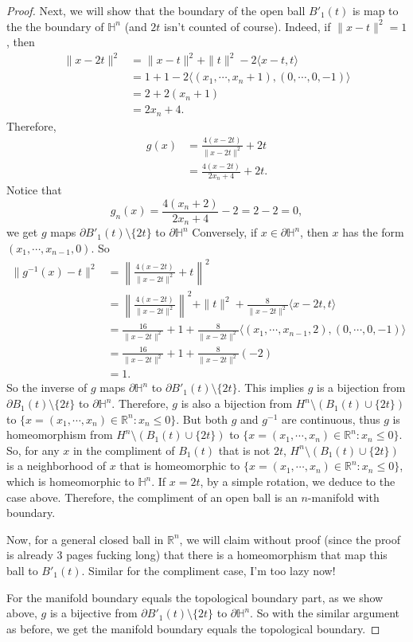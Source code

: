 \documentclass[12pt, a4paper]{article}
\theoremstyle{plain}
\newcommand{\Hs}{\mathbb{H}}
\newcommand{\R}{\mathbb{R}}
\begin{document}
\begin{proof}
	Next, we will show that the boundary of the open ball $B'_1(t)$ is map to the the boundary of $\Hs^n$ (and $2t$ isn't counted of course). Indeed, if $\|x-t\|^2=1$, then 
	\begin{align*}
	\|x-2t\|^2&=\|x-t\|^2+\|t\|^2-2\langle{x-t,t}\rangle\\
	&=1+1-2\langle{(x_1,\cdots,x_n+1),(0,\cdots,0,-1)}\rangle\\
	&= 2+2(x_n+1)\\
	&=2x_n+4.
	\end{align*}
	Therefore, 
	\begin{align*}
	g(x)&=\frac{4(x-2t)}{\|x-2t\|^2}+2t\\
	&=\frac{4(x-2t)}{2x_n+4}+2t.
	\end{align*}
	Notice that 
	\[
	g_n(x)=\frac{4(x_n+2)}{2x_n+4}-2=2-2=0,
	\]
	we get $g$ maps $\partial B'_1(t)\setminus\{2t\}$ to $\partial\Hs^n$ Conversely, if $x\in\partial\Hs^n$, then $x$ has the form $(x_1,\cdots,x_{n-1},0)$. So
	\begin{align*}
	\|g^{-1}(x)-t\|^2&=\left\|\frac{4(x-2t)}{\|x-2t\|^2}+t\right\|^2\\
	&=\left\|\frac{4(x-2t)}{\|x-2t\|^2}\right\|^2+\|t\|^2+\frac{8}{\|x-2t\|^2}\langle{x-2t,t}\rangle\\
	&=\frac{16}{\|x-2t\|^2}+1+\frac{8}{\|x-2t\|^2}\langle{(x_1,\cdots,x_{n-1},2),(0,\cdots,0,-1)}\rangle\\
	&=\frac{16}{\|x-2t\|^2}+1+\frac{8}{\|x-2t\|^2}(-2)\\
	&=1.
	\end{align*}
	So the inverse of $g$ maps $\partial\Hs^n$ to $\partial B'_1(t)\setminus\{2t\}$. This implies $g$ is a bijection from $\partial B_1(t)\setminus\{2t\}$ to $\partial\Hs^n$. Therefore, $g$ is also a bijection from $H^n\setminus (B_1(t)\cup\{2t\})$ to $\{x=(x_1,\cdots,x_n)\in\R^n:x_n\leq 0\}$. But both $g$ and $g^{-1}$ are continuous, thus $g$ is homeomorphism from $H^n\setminus (B_1(t)\cup\{2t\})$ to $\{x=(x_1,\cdots,x_n)\in\R^n:x_n\leq 0\}$. So, for any $x$ in the compliment of $B_1(t)$ that is not $2t$, $H^n\setminus (B_1(t)\cup\{2t\})$ is a neighborhood of $x$ that is homeomorphic to $\{x=(x_1,\cdots,x_n)\in\R^n:x_n\leq 0\}$, which is homeomorphic to $\Hs^n$. If $x=2t$, by a simple rotation, we deduce to the case above. Therefore, the compliment of an open ball is an $n$-manifold with boundary.
	
	Now, for a general closed ball in $\R^n$, we will claim without proof (since the proof is already 3 pages fucking long) that there is a homeomorphism that map this ball to $B'_1(t)$. Similar for the compliment case, I'm too lazy now!
	
	For the manifold boundary equals the topological boundary part, as we show above, $g$ is a bijective from $\partial B'_1(t)\setminus\{2t\}$ to $\partial\Hs^n$. So with the similar argument as before, we get the manifold boundary equals the topological boundary.
	\end{proof}
\end{document}
